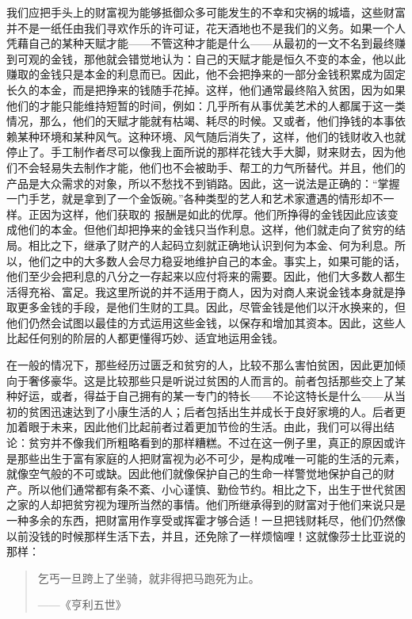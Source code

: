 \documentclass[12pt,oneside]{book}
\begin{document}
我们应把手头上的财富视为能够抵御众多可能发生的不幸和灾祸的城墙，这些财富并不是一纸任由我们寻欢作乐的许可证，花天酒地也不是我们的义务。如果一个人凭藉自己的某种天赋才能——不管这种才能是什么——从最初的一文不名到最终赚到可观的金钱，那他就会错觉地认为：自己的天赋才能是恒久不变的本金，他以此赚取的金钱只是本金的利息而已。因此，他不会把挣来的一部分金钱积累成为固定长久的本金，而是把挣来的钱随手花掉。这样，他们通常最终陷入贫困，因为如果他们的才能只能维持短暂的时间，例如：几乎所有从事优美艺术的人都属于这一类情况，那么，他们的天赋才能就有枯竭、耗尽的时候。又或者，他们挣钱的本事依赖某种环境和某种风气。这种环境、风气随后消失了，这样，他们的钱财收入也就停止了。手工制作者尽可以像我上面所说的那样花钱大手大脚，财来财去，因为他们不会轻易失去制作才能，他们也不会被助手、帮工的力气所替代。并且，他们的产品是大众需求的对象，所以不愁找不到销路。因此，这一说法是正确的：“掌握一门手艺，就是拿到了一个金饭碗。”各种类型的艺人和艺术家遭遇的情形却不一样。正因为这样，他们获取的
报酬是如此的优厚。他们所挣得的金钱因此应该变成他们的本金。但他们却把挣来的金钱只当作利息。这样，他们就走向了贫穷的结局。相比之下，继承了财产的人起码立刻就正确地认识到何为本金、何为利息。所以，他们之中的大多数人会尽力稳妥地维护自己的本金。事实上，如果可能的话，他们至少会把利息的八分之一存起来以应付将来的需要。因此，他们大多数人都生活得充裕、富足。我这里所说的并不适用于商人，因为对商人来说金钱本身就是挣取更多金钱的手段，是他们生财的工具。因此，尽管金钱是他们以汗水换来的，但他们仍然会试图以最佳的方式运用这些金钱，以保存和增加其资本。因此，这些人比起任何别的阶层的人都更懂得巧妙、适宜地运用金钱。 

在一般的情况下，那些经历过匮乏和贫穷的人，比较不那么害怕贫困，因此更加倾向于奢侈豪华。这是比较那些只是听说过贫困的人而言的。前者包括那些交上了某种好运，或者，得益于自己拥有的某一专门的特长——不论这特长是什么——从当初的贫困迅速达到了小康生活的人；后者包括出生并成长于良好家境的人。后者更加着眼于未来，因此他们比起前者过着更加节俭的生活。由此，我们可以得出结论：贫穷并不像我们所粗略看到的那样糟糕。不过在这一例子里，真正的原因或许是那些出生于富有家庭的人把财富视为必不可少，是构成唯一可能的生活的元素，就像空气般的不可或缺。因此他们就像保护自己的生命一样警觉地保护自己的财产。所以他们通常都有条不紊、小心谨慎、勤俭节约。相比之下，出生于世代贫困之家的人却把贫穷视为理所当然的事情。他们所继承得到的财富对于他们来说只是一种多余的东西，把财富用作享受或挥霍才够合适！一旦把钱财耗尽，他们仍然像以前没钱的时候那样生活下去，并且，还免除了一样烦恼哩！这就像莎士比亚说的那样： 

 
\begin{quotation}
乞丐一旦跨上了坐骑，就非得把马跑死为止。 

——《亨利五世》 
\end{quotation}
\end{document}
